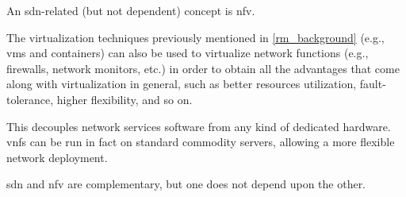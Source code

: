 An \gls{sdn}-related (but not dependent) concept is \gls{nfv}. 

The virtualization techniques previously mentioned in \autoref{rm_background} (e.g., \glspl{vm} and containers) can also be used to virtualize network functions (e.g., firewalls, network monitors, etc.) in order to obtain all the advantages that come along with virtualization in general, such as better resources utilization, fault-tolerance, higher flexibility, and so on.

This decouples network services software from any kind of dedicated hardware.
\Glspl{vnf} can be run in fact on standard commodity servers, allowing a more flexible network deployment.

\gls{sdn} and \gls{nfv} are complementary, but one does not depend upon the other.